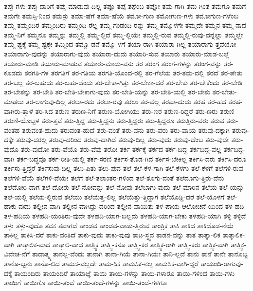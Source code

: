 {ತಪ್ಪು-ಗಳು
ತಪ್ಪು-ದಾರಿಗೆ
ತಪ್ಪು-ಮಾಡುವು-ದಿಲ್ಲ
ತಪ್ಪೂ
ತಪ್ಪೆ
ತಪ್ಪೆಂಬ
ತಪ್ಪೋ
ತಮ-ಗಾಗಿ
ತಮ-ಗಿಂತ
ತಮಗೂ
ತಮಗೆ
ತಮಗೇ
ತಮಸ್ಸಿ-ನಿಂದ
ತಮಸ್ಸು
ತಮಾ-ಷೆಗೆ
ತಮಾ-ಷೆಯೆ
ತಮೋ-ಗುಣ
ತಮೋಗುಣ-ಗಳು
ತಮೋಗುಣ-ಗಳೆಂಬ
ತಮ್ಮ
ತಮ್ಮಂದಿರ
ತಮ್ಮಂದಿರು
ತಮ್ಮಂದಿ-ರೆಲ್ಲ
ತಮ್ಮ-ಗಂಡಂದಿ-ರನ್ನು
ತಮ್ಮ-ತಮ್ಮೊಳಗೇ
ತಮ್ಮದೇ
ತಮ್ಮನ
ತಮ್ಮ-ನಾದ
ತಮ್ಮ-ನಿಗೆ
ತಮ್ಮನೂ
ತಮ್ಮನ್ನು
ತಮ್ಮಲ್ಲಿ
ತಮ್ಮ-ಲ್ಲಿದೆ
ತಮ್ಮ-ಲ್ಲಿಯೇ
ತಮ್ಮಲ್ಲಿ-ರುವ
ತಮ್ಮಲ್ಲಿ-ರುವು-ದನ್ನೆಲ್ಲಾ
ತಮ್ಮಲ್ಲೇ
ತಮ್ಮ-ಷ್ಟಕ್ಕೆ
ತಮ್ಮ-ಷ್ಟಕ್ಕೇ
ತಮ್ಮಿಂದ
ತಮ್ಮೊ-ಡನೆ
ತಮ್ಮೊ-ಳಗೆ
ತಯಾ-ರಾಗಿ
ತಯಾರಾ-ಗಿಲ್ಲ
ತಯಾರಾಗು-ತ್ತವೆಯೋ
ತಯಾರಾಗು-ವುದನ್ನು
ತಯಾರಾಗು-ವುದು
ತಯಾರಾ-ದುದು
ತಯಾರಿ-ಸುವ
ತಯಾರು
ತಯಾರು-ಮಾಡ-ಬಲ್ಲೆ
ತಯಾರು-ಮಾಡಿ
ತಯಾರು-ಮಾಡುವ
ತಯಾರು-ಮಾಡು-ವನು
ತರ
ತರಂಗ
ತರಂಗ-ಗಳನ್ನು
ತರಂಗ-ವನ್ನು
ತರ-ಕೂಡದು
ತರಗತಿ-ಗಳ
ತರಗತಿಗೆ
ತರ-ಗತಿಯ
ತರಗತಿ-ಯೊಂದ-ರಲ್ಲಿ
ತರ-ಗೆಲೆಯ
ತರ-ತಮ-ದಲ್ಲಿ
ತರದೆ
ತರ-ಪೇತು
ತರ-ಬಲ್ಲ
ತರ-ಬಹುದು
ತರ-ಬಹು-ದೆಂದು
ತರ-ಬೇಕಾ-ಗಿತ್ತು
ತರ-ಬೇಕಾ-ದರೆ
ತರ-ಬೇಕು
ತರ-ಬೇಕೆಂದು
ತರ-ಬೇಡಿ
ತರ-ಬೇತನ್ನು
ತರ-ಬೇತಿ
ತರ-ಬೇತಿ-ಬೇಕಾಗು-ವುದು
ತರ-ಬೇತಿ-ಯನ್ನು
ತರ-ಬೇತಿ-ಯಲ್ಲಿ
ತರ-ಬೇತು
ತರ-ಬೇತು-ಮಾಡಲು
ತರ-ಲಾಗುವು-ದಿಲ್ಲ
ತರಲಾ-ರದು
ತರಲಾ-ರವು
ತರಲು
ತರ-ವಲ್ಲ
ತರವಾ-ದುದು
ತರಹ
ತರ-ಹದ
ತರಹ-ವಾಗಿರು-ತ್ತಾಳೆ
ತರಿ-ಸಿದ
ತರುಣ
ತರುಣ-ನಿಗೆ
ತರುಣ-ಯೋಗಿಯು
ತರು-ಣರ
ತರುಣ-ರಿದ್ದರೆ
ತರು-ಣರು
ತರುಣಿ
ತರುಣಿ-ಯೊಬ್ಬಳ
ತರು-ತ್ತವೆ
ತರು-ತ್ತಿದ್ದ
ತರು-ತ್ತಿದ್ದನು
ತರು-ತ್ತಿದ್ದರು
ತರು-ತ್ತಿದ್ದರೂ
ತರುತ್ತಿರು-ವರು
ತರುವ
ತರು-ವಂತಹ
ತರುವಂತ-ಹುದು
ತರುವಂತ-ಹುದೆ
ತರು-ವಂತೆ
ತರು-ವನು
ತರು-ವರು
ತರು-ವಾಯ
ತರುವು-ದಕ್ಕಾಗಿ
ತರುವು-ದಕ್ಕೇ
ತರುವು-ದರಲ್ಲಿ
ತರುವು-ದರಿಂದ
ತರುವು-ದಾಗಿದೆ
ತರುವು-ದಿಲ್ಲ
ತರು-ವುದು
ತರುವು-ದೆಂಬ
ತರು-ವುದೇ
ತರು-ವುದೊ
ತರು-ವುದೋ
ತರು-ವೆಯೊ
ತರು-ವೆವು
ತರೋ
ತರ್ಕ
ತರ್ಕಕ್ಕೆ
ತರ್ಕದ
ತರ್ಕ-ಬದ್ಧ
ತರ್ಕಬದ್ಧ-ವಲ್ಲ
ತರ್ಕಬದ್ಧ-ವಾಗಿ
ತರ್ಕ-ಬದ್ಧವೂ
ತರ್ಕ-ರೀತಿ-ಯಲ್ಲಿ
ತರ್ಕ-ಸರಣಿ
ತರ್ಕಿಸ-ತೊಡ-ಗಿದ
ತರ್ಕಿಸ-ಬೇಕಿಲ್ಲ
ತರ್ಕಿಸಿ-ದರು
ತರ್ಕಿಸಿ-ದರೂ
ತರ್ಕಿಸು-ತ್ತಿದ್ದರೆ
ತರ್ಕಿಸುವು-ದಿಲ್ಲ
ತಲು-ಪಿತು
ತಲು-ಪುವ
ತಲೆ
ತಲೆ-ಕೆಳ-ಗಾಗಿ
ತಲೆ-ಕೆಳಗು
ತಲೆ-ಕೆಳಗೆ
ತಲೆಗಳಿ-ರುವ
ತಲೆಗಳಿ-ವೆಯೆ
ತಲೆಗಳಿ-ವೆಯೇ
ತಲೆಗೆ
ತಲೆ-ತಲಾಂತರ-ಗಳಿಂದ
ತಲೆ-ತೂಗು-ವಂತೆ
ತಲೆದೂಗು-ತ್ತಿರು-ವೆನು
ತಲೆದೋರಿ-ದಾಗ
ತಲೆ-ದೋರು
ತಲೆ-ನೋವನ್ನು
ತಲೆ-ನೋವು
ತಲೆಬಾಗು-ವುದು
ತಲೆ-ಮಾರಿನ
ತಲೆಯ
ತಲೆ-ಯನ್ನು
ತಲೆ-ಯಲ್ಲಿ
ತಲೆಯ-ಲ್ಲಿರುವ
ತಲೆಯು
ತಲೆಯೆತ್ತ-ಲಿಲ್ಲ
ತಲೆಯೆತ್ತು-ತ್ತಿದ್ದಾಗ
ತಲೆಯೊಡ್ಡಿ-ದರೆ
ತಲೆ-ಯೊಳಗೆ
ತಲೆ-ಹಾಕು-ವುದು
ತಲ್ಲೀನ-ವಾಗಿ
ತಲ್ಲೀನ-ವಾಗಿದ್ದು-ದರಿಂದ
ತಲ್ಲೀನ-ವಾಯಿತು
ತಳ-ಪಾಯ-ಆಲೋಚನೆ-ಯಿಂದ
ತಳ-ಹದಿ
ತಳ-ಹದಿಯ
ತಳಹದಿ-ಯಂತಿರು-ವುದೇ
ತಳಹದಿ-ಯಾಗ-ಬಲ್ಲದು
ತಳಹದಿ-ಯಾಗ-ಬೇಕು
ತಳಹದಿ-ಯಾಗಿ
ತಳ್ಳಿ
ತಳ್ಳಿದೆ
ತಳ್ಳು
ತಳ್ಳು-ವುದೊ
ತವಕ
ತವಾಗದೆ
ತಾಂಡವ
ತಾಂಡವ-ವಾಡು-ತ್ತಿರುವ
ತಾಂತ್ರಿಕ
ತಾಕಿ
ತಾಕಿದ
ತಾಕಿದೊಡ-ನೆಯೆ
ತಾಕಿಲ್ಲ
ತಾಕಿಸಿ-ದರೆ
ತಾಕು-ವಂತಿದೆ
ತಾಕು-ವುದು
ತಾಕು-ವುವು
ತಾಟ-ಸ್ಥ್ಯದ
ತಾಡನ-ವನ್ನು
ತಾತ
ತಾತ್ಕಾ-ಲಿಕ
ತಾತ್ಕಾಲಿಕ-ವಾಗಿ
ತಾತ್ಕಾಲಿಕ-ವಾದ
ತಾತ್ಕಾಲಿ-ವಾದ
ತಾತ್ತ್ವಿಕ
ತಾತ್ತ್ವಿ-ಕನೂ
ತಾತ್ತ್ವಿ-ಕರ
ತಾತ್ತ್ವಿಕ-ರಾಗಿ
ತಾತ್ತ್ವಿ-ಕರು
ತಾತ್ತ್ವಿಕ-ವಾಗಿ
ತಾತ್ತ್ವಿಕ-ವಿವೇಚ-ನೆಗೆ
ತಾದಾತ್ಮ್ಯ
ತಾನಲ್ಲ-ವೆಂದು
ತಾನಾಗಿ
ತಾನಾ-ಗಿಯೆ
ತಾನಾ-ಗಿಯೇ
ತಾನಿ-ಲ್ಲದೆ
ತಾನು
ತಾನೆ
ತಾನೇ
ತಾನೊಬ್ಬ
ತಾನೊ-ಬ್ಬನು
ತಾನೊ-ಲಿದ
ತಾಮಸ-ವಲ್ಲದೇ
ತಾಮ-ಸಿಕ
ತಾಮಸಿಕ-ನಲ್ಲ
ತಾಮಸಿಕ-ವಾಗಿ-ದ್ದರೆ
ತಾಯಂದಿ-ರಾಗುವು-ದಕ್ಕೆ
ತಾಯಂದಿರು
ತಾಯಂದಿರೆ
ತಾಯಾಜ್ಞೆ
ತಾಯಿ
ತಾಯಿ-ಗಳನ್ನು
ತಾಯಿ-ಗಳಾರೂ
ತಾಯಿ-ಗಳಿಂದ
ತಾಯಿ-ಗಳು
ತಾಯಿಗೆ
ತಾಯಿಗೊ
ತಾಯಿ-ತಂದೆ
ತಾಯಿ-ತಂದೆ-ಗಳನ್ನು
ತಾಯಿ-ತಂದೆ-ಗಳಿಗೂ
}
